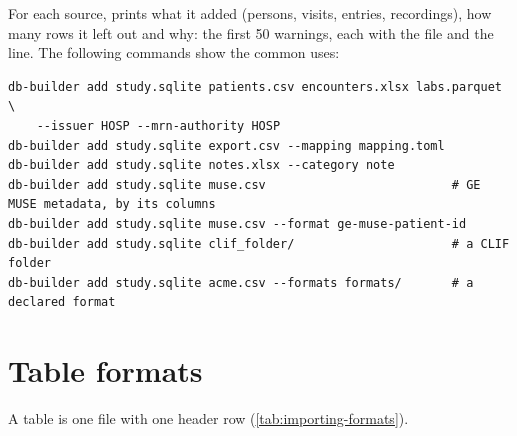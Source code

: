 For each source,  prints what it added (persons, visits, entries, recordings), how many
rows it left out and why: the first 50 warnings, each with the file and the line. The following
commands show the common uses:
\begin{lstlisting}[style=shell]
db-builder add study.sqlite patients.csv encounters.xlsx labs.parquet \
    --issuer HOSP --mrn-authority HOSP
db-builder add study.sqlite export.csv --mapping mapping.toml
db-builder add study.sqlite notes.xlsx --category note
db-builder add study.sqlite muse.csv                          # GE MUSE metadata, by its columns
db-builder add study.sqlite muse.csv --format ge-muse-patient-id
db-builder add study.sqlite clif_folder/                      # a CLIF folder
db-builder add study.sqlite acme.csv --formats formats/       # a declared format
\end{lstlisting}

\section{Table formats}
\label{sec:importing-formats}

A table is one file with one header row (\cref{tab:importing-formats}).

